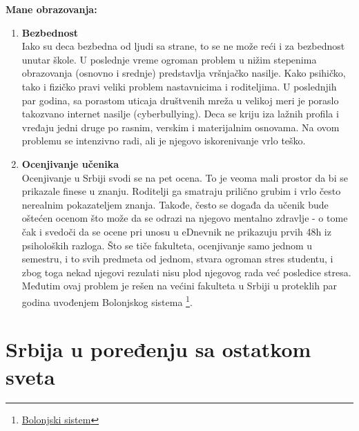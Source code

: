 \documentclass[a4paper]{article}
\begin{document}
\textbf{ Mane obrazovanja:}
\begin{enumerate}
    \item \textbf{Bezbednost}
     \\Iako su deca bezbedna od ljudi sa strane, to se ne može reći i za bezbednost unutar škole. U poslednje vreme ogroman problem u nižim stepenima obrazovanja (osnovno i srednje) predstavlja vršnjačko nasilje. Kako psihičko, tako i fizičko pravi veliki problem nastavnicima i roditeljima. U poslednjih par godina, sa porastom uticaja društvenih mreža u velikoj meri je poraslo takozvano internet nasilje (cyberbullying). Deca se kriju iza lažnih profila i vređaju jedni druge po rasnim, verskim i materijalnim osnovama. Na ovom problemu se intenzivno radi, ali je njegovo iskorenivanje vrlo teško. 
     \item \textbf{Ocenjivanje učenika}
     \\Ocenjivanje u Srbiji svodi se na pet ocena. To je veoma mali prostor da bi se prikazale finese u znanju. Roditelji ga smatraju prilično grubim i vrlo često nerealnim pokazateljem znanja. Takođe, često se događa da učenik bude oštećen ocenom što može da se odrazi na njegovo mentalno zdravlje - o tome čak i svedoči da se ocene pri unosu u eDnevnik ne prikazuju prvih 48h iz psiholoških razloga.
     Što se tiče fakulteta, ocenjivanje samo jednom u semestru, i to svih predmeta od jednom, stvara ogroman stres studentu, i zbog toga nekad njegovi rezulati nisu plod njegovog rada već posledice stresa. Međutim ovaj problem je rešen na većini fakulteta u Srbiji u proteklih par godina uvođenjem Bolonjskog sistema \footnote{\href{https://www.eduinfo.ba/zakoni-u-obrazovanju}{Bolonjski sistem} }.

\end{enumerate}
\section{Srbija u poređenju sa ostatkom sveta}
\end{document}
